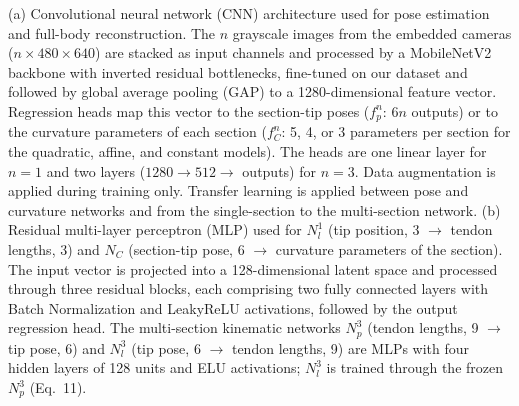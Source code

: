 \caption{(a) Convolutional neural network (CNN) architecture used for pose estimation and full-body reconstruction. The $n$ grayscale images from the embedded cameras ($n \times 480 \times 640$) are stacked as input channels and processed by a MobileNetV2 backbone with inverted residual bottlenecks, fine-tuned on our dataset and followed by global average pooling (GAP) to a 1280-dimensional feature vector. Regression heads map this vector to the section-tip poses ($f_p^n$: $6n$ outputs) or to the curvature parameters of each section ($f_C^n$: 5, 4, or 3 parameters per section for the quadratic, affine, and constant models). The heads are one linear layer for $n = 1$ and two layers ($1280 \to 512 \to$ outputs) for $n = 3$. Data augmentation is applied during training only. Transfer learning is applied between pose and curvature networks and from the single-section to the multi-section network. (b) Residual multi-layer perceptron (MLP) used for $N_l^1$ (tip position, 3 $\to$ tendon lengths, 3) and $N_C$ (section-tip pose, 6 $\to$ curvature parameters of the section). The input vector is projected into a 128-dimensional latent space and processed through three residual blocks, each comprising two fully connected layers with Batch Normalization and LeakyReLU activations, followed by the output regression head. The multi-section kinematic networks $N_p^3$ (tendon lengths, 9 $\to$ tip pose, 6) and $N_l^3$ (tip pose, 6 $\to$ tendon lengths, 9) are MLPs with four hidden layers of 128 units and ELU activations; $N_l^3$ is trained through the frozen $N_p^3$ (Eq.~11).}
